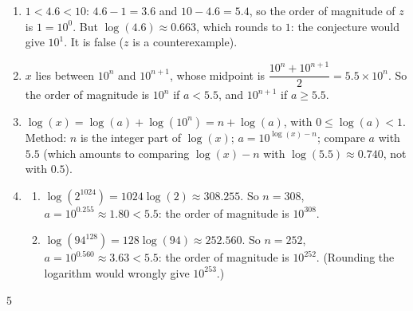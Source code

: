 {\begin{enumerate}
\begin{enumerate}[label=\alph*.]
  \end{enumerate}
\item $1<\num{4,6}<10$: $\num{4,6}-1=\num{3,6}$ and $10-\num{4,6}=\num{5,4}$, so the order of magnitude of $z$ is $1=10^0$. But $\log(\num{4,6})\approx\num{0,663}$, which rounds to $1$: the conjecture would give $10^1$. It is false ($z$ is a counterexample).
\item $x$ lies between $10^n$ and $10^{n+1}$, whose midpoint is $\dfrac{10^n+10^{n+1}}2=\num{5,5}\times10^n$. So the order of magnitude is $10^n$ if $a<\num{5,5}$, and $10^{n+1}$ if $a\geqslant\num{5,5}$.
\item $\log(x)=\log(a)+\log(10^n)=n+\log(a)$, with $0\leqslant\log(a)<1$. Method: $n$ is the integer part of $\log(x)$; $a=10^{\log(x)-n}$; compare $a$ with $\num{5,5}$ (which amounts to comparing $\log(x)-n$ with $\log(\num{5,5})\approx\num{0,740}$, not with $\num{0,5}$).
\item
  \begin{enumerate}[label=\alph*.]
  \item $\log(2^{\num{1024}})=\num{1024}\log(2)\approx\num{308,255}$. So $n=308$, $a=10^{\num{0,255}}\approx\num{1,80}<\num{5,5}$: the order of magnitude is $10^{308}$.
  \item $\log(94^{128})=128\log(94)\approx\num{252,560}$. So $n=252$, $a=10^{\num{0,560}}\approx\num{3,63}<\num{5,5}$: the order of magnitude is $10^{252}$. (Rounding the logarithm would wrongly give $10^{253}$.)
  \end{enumerate}
\end{enumerate}
}{5}

